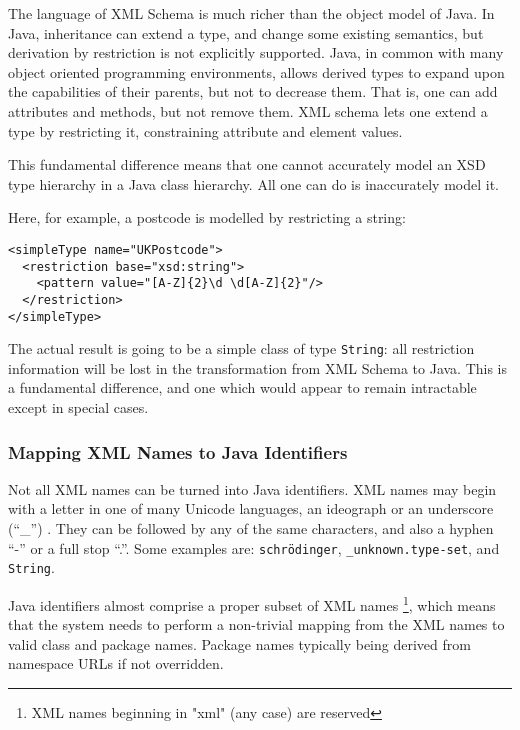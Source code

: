 The language of XML Schema is much richer than the object model of
Java. In Java, inheritance can extend a type, and change some existing
semantics, but derivation by restriction is not explicitly
supported. Java, in common with many object oriented programming
environments, allows derived types to expand upon the capabilities of
their parents, but not to decrease them. That is, one can add attributes and
methods, but not remove them. XML schema lets one extend a type by 
restricting it, constraining attribute and element values.

This fundamental difference means that one cannot accurately model an
XSD type hierarchy in a Java class hierarchy. All one can do is
inaccurately model it.

Here, for example, a postcode is modelled by restricting a string:


\begin{verbatim}
<simpleType name="UKPostcode">
  <restriction base="xsd:string">
    <pattern value="[A-Z]{2}\d \d[A-Z]{2}"/>
  </restriction>
</simpleType>
\end{verbatim}

The actual result is going to be a simple class of type {\tt String}:
all restriction information will be lost in the transformation from
XML Schema to Java. This is a fundamental difference, and one which
would appear to remain intractable except in special cases.

\subsubsection{Mapping XML Names to Java Identifiers}
\label{objections:o-x:names}

Not all XML names can be turned into Java identifiers.  XML names may
begin with a letter in one of many Unicode languages, an ideograph or
an underscore (``\_'') . They can be followed by any of the same
characters, and also a hyphen ``-'' or a full stop ``.''. Some
examples are: {\tt schr\"odinger}, {\tt \_unknown.type-set}, and {\tt
String}.

Java identifiers almost comprise a proper subset of XML names
\footnote{XML names beginning in "xml" (any case) are reserved},
which means that the system needs to perform a non-trivial mapping
from the XML names to valid class and package names. Package names
typically being derived from namespace URLs if not overridden.

